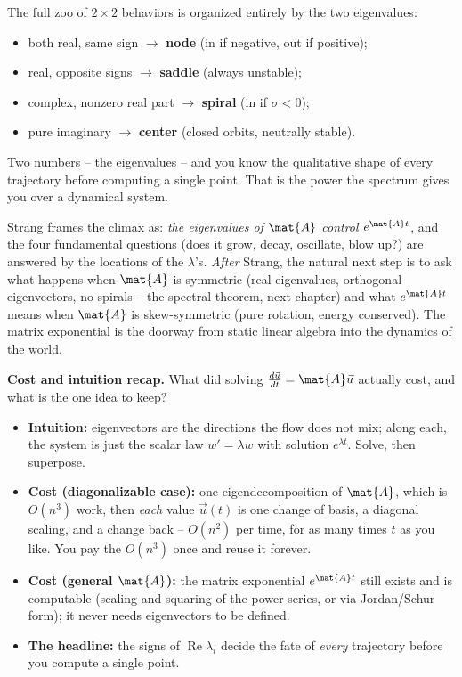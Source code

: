 \begin{intuitionbox}
The full zoo of $2\times2$ behaviors is organized entirely by the two
eigenvalues:
\begin{itemize}
  \item both real, same sign $\to$ \textbf{node} (in if negative, out if positive);
  \item real, opposite signs $\to$ \textbf{saddle} (always unstable);
  \item complex, nonzero real part $\to$ \textbf{spiral} (in if $\sigma<0$);
  \item pure imaginary $\to$ \textbf{center} (closed orbits, neutrally stable).
\end{itemize}
Two numbers -- the eigenvalues -- and you know the qualitative shape of every
trajectory before computing a single point. That is the power the spectrum gives
you over a dynamical system.
\end{intuitionbox}

\begin{strangbox}
Strang frames the climax as: \emph{the eigenvalues of $\mat{A}$ control
$e^{\mat{A}t}$}, and the four fundamental questions (does it grow, decay,
oscillate, blow up?) are answered by the locations of the $\lambda$'s. \emph{After}
Strang, the natural next step is to ask what happens when $\mat{A}$ is symmetric
(real eigenvalues, orthogonal eigenvectors, no spirals -- the spectral theorem,
next chapter) and what $e^{\mat{A}t}$ means when $\mat{A}$ is skew-symmetric
(pure rotation, energy conserved). The matrix exponential is the doorway from
static linear algebra into the dynamics of the world.
\end{strangbox}

\begin{recoverybox}
\textbf{Cost and intuition recap.} What did solving
$\frac{d\vec{u}}{dt}=\mat{A}\vec{u}$ actually cost, and what is the one idea to
keep?
\begin{itemize}
  \item \textbf{Intuition:} eigenvectors are the directions the flow does not
        mix; along each, the system is just the scalar law $w'=\lambda w$ with
        solution $e^{\lambda t}$. Solve, then superpose.
  \item \textbf{Cost (diagonalizable case):} one eigendecomposition of $\mat{A}$,
        which is $O(n^3)$ work, then \emph{each} value $\vec{u}(t)$ is one
        change of basis, a diagonal scaling, and a change back -- $O(n^2)$ per
        time, for as many times $t$ as you like. You pay the $O(n^3)$ once and
        reuse it forever.
  \item \textbf{Cost (general $\mat{A}$):} the matrix exponential $e^{\mat{A}t}$
        still exists and is computable (scaling-and-squaring of the power series,
        or via Jordan/Schur form); it never needs eigenvectors to be defined.
  \item \textbf{The headline:} the signs of $\operatorname{Re}\lambda_i$ decide
        the fate of \emph{every} trajectory before you compute a single point.
\end{itemize}
\end{recoverybox}

